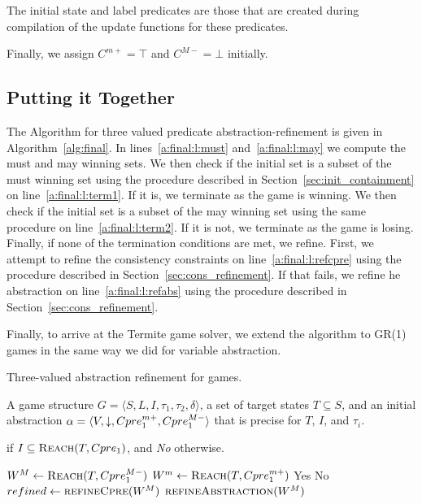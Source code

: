 The initial state and label predicates are those that are created during compilation of the update functions for these predicates.

Finally, we assign $C^{m+}=\top$ and $C^{M-}=\bot$ initially.

\subsection{Putting it Together}

The Algorithm for three valued predicate abstraction-refinement is given in Algorithm~\ref{alg:final}. In lines~\ref{a:final:l:must} and~\ref{a:final:l:may} we compute the must and may winning sets. We then check if the initial set is a subset of the must winning set using the procedure described in Section~\ref{sec:init_containment} on line~\ref{a:final:l:term1}. If it is, we terminate as the game is winning. We then check if the initial set is a subset of the may winning set using the same procedure on line~\ref{a:final:l:term2}. If it is not, we terminate as the game is losing. Finally, if none of the termination conditions are met, we refine. First, we attempt to refine the consistency constraints on line~\ref{a:final:l:refcpre} using the procedure described in Section~\ref{sec:cons_refinement}. If that fails, we refine he abstraction on line~\ref{a:final:l:refabs} using the procedure described in Section~\ref{sec:cons_refinement}.

Finally, to arrive at the Termite game solver, we extend the algorithm to GR(1) games in the same way we did for variable abstraction.

\begin{algorithm}
\caption{Three-valued abstraction refinement for games.}
\label{alg:final}

\begin{algorithmic}[1]

\Require A game structure $G = \langle S, L, I, \tau_1, \tau_2, \delta \rangle$, a set of target states $T\subseteq S$, and an initial abstraction $\alpha=\langle V, \mathord{\downarrow}, Cpre_1^{m+}, Cpre_1^{M-} \rangle$ that is precise for $T$, $I$, and $\tau_i$.

 if $I \subseteq \textsc{Reach}(T, Cpre_1)$, and {\it No} otherwise.

    \Loop
        \State $W^M \gets \textsc{Reach}(T, Cpre_1^{M-})$             \label{a:final:l:must}
        \State $W^m \gets \textsc{Reach}(T, Cpre_1^{m+})$             \label{a:final:l:may}
            \label{a:final:l:term1}
            \State\Return Yes
         \label{a:final:l:term2}
            \State\Return No
        \Else       
            \State $refined \gets \Call{refineCpre}{W^M}$     \label{a:final:l:refcpre}
                \State$\Call{refineAbstraction}{W^M}$         \label{a:final:l:refabs}
            \EndIf
        \EndIf
    \EndLoop
\EndFunction

\end{algorithmic}
\end{algorithm}



